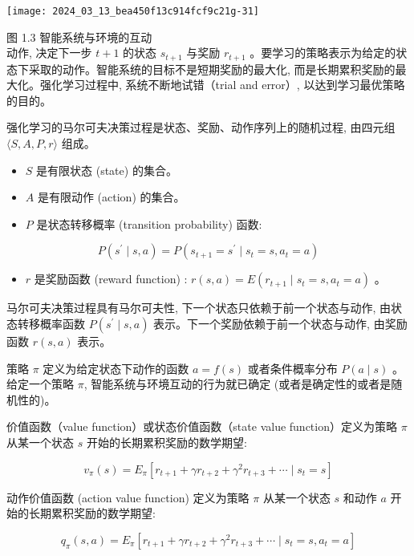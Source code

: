 \documentclass[10pt]{article}
\begin{document}
\begin{CJK*}{UTF8}{bsmi}
\begin{center}
\texttt{[image: 2024\_03\_13\_bea450f13c914fcf9c21g-31]}
\end{center}

图 1.3 智能系统与环境的互动\\
动作, 决定下一步 $t+1$ 的状态 $s_{t+1}$ 与奖励 $r_{t+1}$ 。要学习的策略表示为给定的状态下采取的动作。智能系统的目标不是短期奖励的最大化, 而是长期累积奖励的最大化。强化学习过程中, 系统不断地试错（trial and error）, 以达到学习最优策略的目的。

强化学习的马尔可夫决策过程是状态、奖励、动作序列上的随机过程, 由四元组 $\langle S, A, P, r\rangle$ 组成。

\begin{itemize}
  \item $S$ 是有限状态 (state) 的集合。
  \item $A$ 是有限动作 (action) 的集合。
  \item $P$ 是状态转移概率 (transition probability) 函数:
\end{itemize}

$$
P\left(s^{\prime} \mid s, a\right)=P\left(s_{t+1}=s^{\prime} \mid s_{t}=s, a_{t}=a\right)
$$

\begin{itemize}
  \item $r$ 是奖励函数 (reward function) : $r(s, a)=E\left(r_{t+1} \mid s_{t}=s, a_{t}=a\right)$ 。
\end{itemize}

马尔可夫决策过程具有马尔可夫性, 下一个状态只依赖于前一个状态与动作, 由状态转移概率函数 $P\left(s^{\prime} \mid s, a\right)$ 表示。下一个奖励依赖于前一个状态与动作, 由奖励函数 $r(s, a)$ 表示。

策略 $\pi$ 定义为给定状态下动作的函数 $a=f(s)$ 或者条件概率分布 $P(a \mid s)$ 。给定一个策略 $\pi$, 智能系统与环境互动的行为就已确定 (或者是确定性的或者是随机性的)。

价值函数（value function）或状态价值函数（state value function）定义为策略 $\pi$ 从某一个状态 $s$ 开始的长期累积奖励的数学期望:


\begin{equation*}
v_{\pi}(s)=E_{\pi}\left[r_{t+1}+\gamma r_{t+2}+\gamma^{2} r_{t+3}+\cdots \mid s_{t}=s\right] \tag{1.1}
\end{equation*}


动作价值函数 (action value function) 定义为策略 $\pi$ 从某一个状态 $s$ 和动作 $a$ 开始的长期累积奖励的数学期望:


\begin{equation*}
q_{\pi}(s, a)=E_{\pi}\left[r_{t+1}+\gamma r_{t+2}+\gamma^{2} r_{t+3}+\cdots \mid s_{t}=s, a_{t}=a\right] \tag{1.2}
\end{equation*}



\end{CJK*}
\end{document}
